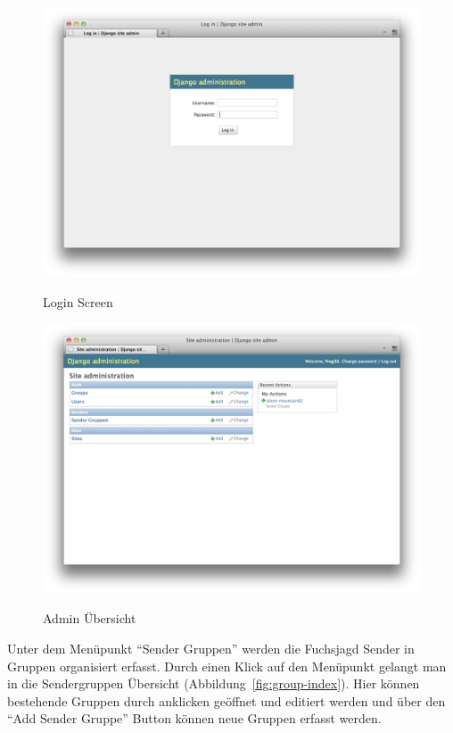 \begin{figure}[H]
	\centering			      
        \includegraphics[scale=0.35]{images/admin-login.png}\\
		\caption{Login Screen}
	\label{fig:admin-login}
\end{figure}

\begin{figure}[H]
	\centering			      
        \includegraphics[scale=0.35]{images/admin-index.png}\\
		\caption{Admin Übersicht}
	\label{fig:admin-index}
\end{figure}

Unter dem Menüpunkt "`Sender Gruppen"' werden die Fuchsjagd Sender in Gruppen organisiert erfasst. Durch einen Klick auf den Menüpunkt gelangt man in die Sendergruppen Übersicht (Abbildung~\ref{fig:group-index}). Hier können bestehende Gruppen durch anklicken geöffnet und editiert werden und über den "`Add Sender Gruppe"' Button können neue Gruppen erfasst werden.

